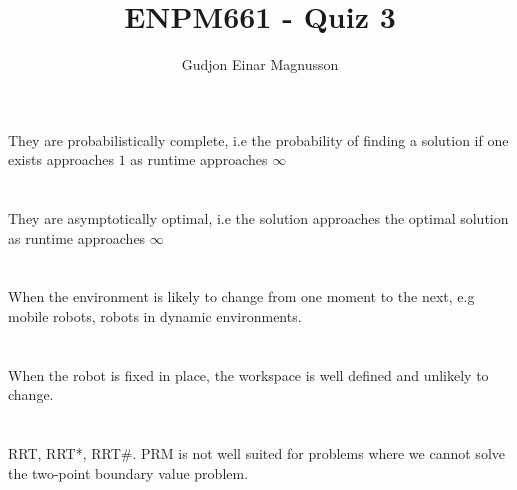 \documentclass[12pt]{article}
\begin{document}
\title{ENPM661 - Quiz 3}
\author{Gudjon Einar Magnusson}

\maketitle

\section{} %

They are probabilistically complete, i.e the probability of finding a solution if one exists approaches $1$ as runtime approaches $\infty$


\section{} %

They are asymptotically optimal, i.e the solution approaches the optimal solution as runtime approaches $\infty$


\section{} %

When the environment is likely to change from one moment to the next, e.g mobile robots, robots in dynamic environments.


\section{} %

When the robot is fixed in place, the workspace is well defined and unlikely to change.


\section{} %

RRT, RRT*, RRT\#. PRM is not well suited for problems where we cannot solve the two-point boundary value problem.
\end{document}
